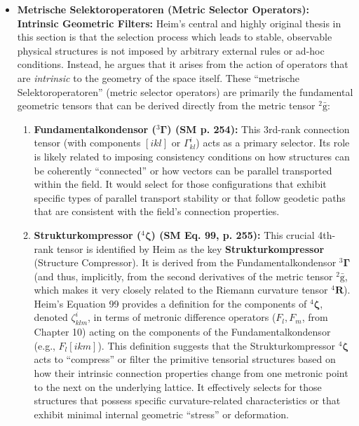\documentclass[12pt]{article}
\newcommand{\q}[1]{\enquote{#1}}
\newcommand{\kompositionsfeld}{{}^2\bar{\mathrm{g}}}
\newcommand{\fundamentalkondensor}{{}^3\bm{\Gamma}}
\newcommand{\strukturkompressor}{{}^4\bm{\zeta}}
\begin{document}
\begin{itemize}
    \item \textbf{Metrische Selektoroperatoren (Metric Selector Operators): Intrinsic Geometric Filters:}
    Heim's central and highly original thesis in this section is that the selection process which leads to stable, observable physical structures is not imposed by arbitrary external rules or ad-hoc conditions. Instead, he argues that it arises from the action of operators that are \textit{intrinsic} to the geometry of the space itself. These \q{metrische Selektoroperatoren} (metric selector operators) are primarily the fundamental geometric tensors that can be derived directly from the metric tensor \( \kompositionsfeld \):
    \begin{enumerate}
        \item \textbf{Fundamentalkondensor (\( \fundamentalkondensor \)) (SM p. 254):} This 3rd-rank connection tensor (with components \( [ikl] \) or \( \Gamma^i_{kl} \)) acts as a primary selector. Its role is likely related to imposing consistency conditions on how structures can be coherently \q{connected} or how vectors can be parallel transported within the field. It would select for those configurations that exhibit specific types of parallel transport stability or that follow geodetic paths that are consistent with the field's connection properties.
        \item \textbf{Strukturkompressor (\( \strukturkompressor \)) (SM Eq. 99, p. 255):} This crucial 4th-rank tensor is identified by Heim as the key \textbf{Strukturkompressor} (Structure Compressor). It is derived from the Fundamentalkondensor \( \fundamentalkondensor \) (and thus, implicitly, from the second derivatives of the metric tensor \( \kompositionsfeld \), which makes it very closely related to the Riemann curvature tensor \( {}^4\mathbf{R} \)). Heim's Equation 99 provides a definition for the components of \( \strukturkompressor \), denoted \( \zeta^i_{klm} \), in terms of metronic difference operators (\( F_l, F_m \), from Chapter 10) acting on the components of the Fundamentalkondensor (e.g., \( F_l[ikm] \)). This definition suggests that the Strukturkompressor \( \strukturkompressor \) acts to \q{compress} or filter the primitive tensorial structures based on how their intrinsic connection properties change from one metronic point to the next on the underlying lattice. It effectively selects for those structures that possess specific curvature-related characteristics or that exhibit minimal internal geometric \q{stress} or deformation.
        \begin{equation} 

\end{equation}
\end{enumerate}
\end{itemize}
\end{document}
